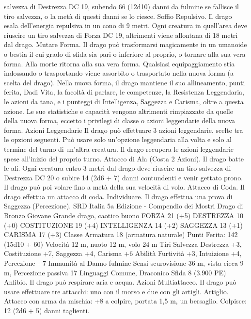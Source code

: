 \begin{multicols}{2}
salvezza di Destrezza DC 19, subendo 66 (12d10) danni da fulmine
se fallisce il tiro salvezza, o la metà di questi danni se lo riesce.
Soffio Repulsivo. Il drago esala dell’energia repulsiva in un cono di 9
metri. Ogni creatura in quell’area deve riuscire un tiro salvezza di
Forza DC 19, altrimenti viene allontana di 18 metri dal drago.
Mutare Forma. Il drago può trasformarsi magicamente in un
umanoide o bestia il cui grado di sfida sia pari o inferiore al proprio,
o tornare alla sua vera forma. Alla morte ritorna alla sua vera forma.
Qualsiasi equipaggiamento stia indossando o trasportando viene
assorbito o trasportato nella nuova forma (a scelta del drago).
Nella nuova forma, il drago mantiene il suo allineamento, punti
ferita, Dadi Vita, la facoltà di parlare, le competenze, la Resistenza
Leggendaria, le azioni da tana, e i punteggi di Intelligenza, Saggezza
e Carisma, oltre a questa azione. Le sue statistiche e capacità
vengono altrimenti rimpiazzate da quelle della nuova forma, eccetto i
privilegi di classe o azioni leggendarie della nuova forma.
Azioni Leggendarie
Il drago può effettuare 3 azioni leggendarie, scelte tra le opzioni
seguenti. Può usare solo un’opzione leggendaria alla volta e solo
al termine del turno di un’altra creatura. Il drago recupera le
azioni leggendarie spese all’inizio del proprio turno.
Attacco di Ala (Costa 2 Azioni). Il drago batte le ali. Ogni
creatura entro 3 metri dal drago deve riuscire un tiro salvezza di
Destrezza DC 20 o subire 14 (2d6 + 7) danni contundenti e venir
gettato prono. Il drago può poi volare fino a metà della sua
velocità di volo.
Attacco di Coda. Il drago effettua un attacco di coda.
Individuare. Il drago effettua una prova di Saggezza
(Percezione).
SRD Italia 5a Edizione - Compendio dei Mostri
Drago di Bronzo Giovane
Grande drago, caotico buono
FORZA 21 (+5)
DESTREZZA 10 (+0)
COSTITUZIONE 19 (+4)
INTELLIGENZA 14 (+2)
SAGGEZZA 13 (+1)
CARISMA 17 (+3)
Classe Armatura 18 (armatura naturale)
\hspace*{0pt}\hfill{Punti Ferita}: 142 (15d10 + 60)
Velocità 12 m, nuoto 12 m, volo 24 m
Tiri Salvezza Destrezza +3, Costituzione +7, Saggezza +4,
Carisma +6
Abilità Furtività +3, Intuizione +4, Percezione +7
Immunità al Danno fulmine
Sensi scurovisione 36 m, vista cieca 9 m, Percezione passiva 17
Linguaggi Comune, Draconico
Sfida 8 (3.900 PE)
Anfibio. Il drago può respirare aria e acqua.
Azioni
Multiattacco. Il drago può usare effettuare tre attacchi: uno con
il morso e due con gli artigli.
Artiglio. Attacco con arma da mischia: +8 a colpire, portata 1,5
m, un bersaglio.
Colpisce: 12 (2d6 + 5) danni taglienti.

\end{multicols}
